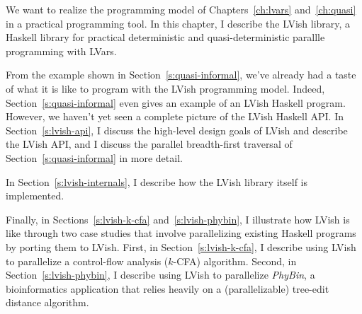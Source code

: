 
We want to realize the programming model of Chapters~\ref{ch:lvars}
and~\ref{ch:quasi} in a practical programming tool.  In this chapter,
I describe the LVish library, a Haskell library for practical
deterministic and quasi-deterministic parallle programming with LVars.

From the example shown in Section~\ref{s:quasi-informal}, we've
already had a taste of what it is like to program with the LVish
programming model.  Indeed, Section~\ref{s:quasi-informal} even gives
an example of an LVish Haskell program.  However, we haven't yet seen
a complete picture of the LVish Haskell API.  In
Section~\ref{s:lvish-api}, I discuss the high-level design goals of
LVish and describe the LVish API, and I discuss the parallel
breadth-first traversal of Section~\ref{s:quasi-informal} in more
detail.

In Section~\ref{s:lvish-internals}, I describe how the LVish library
itself is implemented. 

Finally, in Sections~\ref{s:lvish-k-cfa} and~\ref{s:lvish-phybin}, I
illustrate how LVish is like through two case studies that involve
parallelizing existing Haskell programs by porting them to LVish.
First, in Section~\ref{s:lvish-k-cfa}, I describe using LVish to
parallelize a control-flow analysis ($k$-CFA) algorithm.  Second, in
Section~\ref{s:lvish-phybin}, I describe using LVish to parallelize
\emph{PhyBin}, a bioinformatics application that relies heavily on a
(parallelizable) tree-edit distance algorithm.

